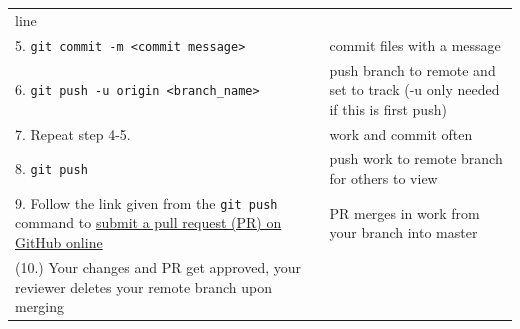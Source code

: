 \documentclass[]{book}
\begin{document}
\begin{longtable}[]{@{}ll@{}}
\begin{minipage}[t]{0.22\columnwidth}
line\strut
\end{minipage}\tabularnewline
\begin{minipage}[t]{0.13\columnwidth}\raggedright\strut
5.
\texttt{git\ commit\ -m\ \textless{}commit\ message\textgreater{}}\strut
\end{minipage} & \begin{minipage}[t]{0.22\columnwidth}\raggedright\strut
commit files with a message\strut
\end{minipage}\tabularnewline
\begin{minipage}[t]{0.13\columnwidth}\raggedright\strut
6.
\texttt{git\ push\ -u\ origin\ \textless{}branch\_name\textgreater{}}\strut
\end{minipage} & \begin{minipage}[t]{0.22\columnwidth}\raggedright\strut
push branch to remote and set to track (-u only needed if this is first
push)\strut
\end{minipage}\tabularnewline
\begin{minipage}[t]{0.13\columnwidth}\raggedright\strut
7. Repeat step 4-5.\strut
\end{minipage} & \begin{minipage}[t]{0.22\columnwidth}\raggedright\strut
work and commit often\strut
\end{minipage}\tabularnewline
\begin{minipage}[t]{0.13\columnwidth}\raggedright\strut
8. \texttt{git\ push}\strut
\end{minipage} & \begin{minipage}[t]{0.22\columnwidth}\raggedright\strut
push work to remote branch for others to view\strut
\end{minipage}\tabularnewline
\begin{minipage}[t]{0.13\columnwidth}\raggedright\strut
9. Follow the link given from the \texttt{git\ push} command to
\href{https://help.github.com/en/github/collaborating-with-issues-and-pull-requests/creating-a-pull-request\#creating-the-pull-request}{submit
a pull request (PR) on GitHub online}\strut
\end{minipage} & \begin{minipage}[t]{0.22\columnwidth}\raggedright\strut
PR merges in work from your branch into master\strut
\end{minipage}\tabularnewline
\begin{minipage}[t]{0.13\columnwidth}\raggedright\strut
(10.) Your changes and PR get approved, your reviewer deletes your
remote branch upon merging\strut
\end{minipage} & \begin{minipage}[t]{0.22\columnwidth}\raggedright\strut

\end{minipage}
\end{longtable}
\end{document}
